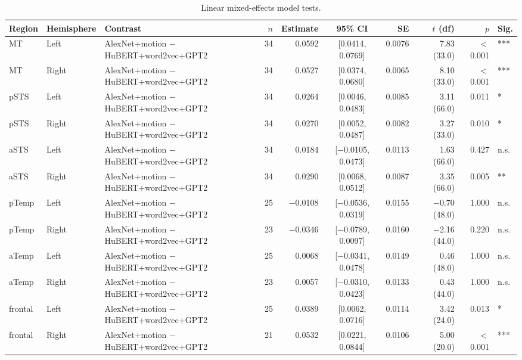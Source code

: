 \begin{table}[h]
\centering
\begin{tabular}{lllrrcrrrl}
\toprule
Region & Hemisphere & Contrast & $n$ & Estimate & 95\% CI & SE & $t$ (df) & $p$ & Sig. \\
\midrule
MT & Left & AlexNet+motion $-$ HuBERT+word2vec+GPT2 & 34 & 0.0592 & [0.0414, 0.0769] & 0.0076 & 7.83 (33.0) & $<$0.001 & *** \\
MT & Right & AlexNet+motion $-$ HuBERT+word2vec+GPT2 & 34 & 0.0527 & [0.0374, 0.0680] & 0.0065 & 8.10 (33.0) & $<$0.001 & *** \\
pSTS & Left & AlexNet+motion $-$ HuBERT+word2vec+GPT2 & 34 & 0.0264 & [0.0046, 0.0483] & 0.0085 & 3.11 (66.0) & 0.011 & * \\
pSTS & Right & AlexNet+motion $-$ HuBERT+word2vec+GPT2 & 34 & 0.0270 & [0.0052, 0.0487] & 0.0082 & 3.27 (33.0) & 0.010 & * \\
aSTS & Left & AlexNet+motion $-$ HuBERT+word2vec+GPT2 & 34 & 0.0184 & [$-$0.0105, 0.0473] & 0.0113 & 1.63 (66.0) & 0.427 & n.s. \\
aSTS & Right & AlexNet+motion $-$ HuBERT+word2vec+GPT2 & 34 & 0.0290 & [0.0068, 0.0512] & 0.0087 & 3.35 (66.0) & 0.005 & ** \\
pTemp & Left & AlexNet+motion $-$ HuBERT+word2vec+GPT2 & 25 & $-$0.0108 & [$-$0.0536, 0.0319] & 0.0155 & $-$0.70 (48.0) & 1.000 & n.s. \\
pTemp & Right & AlexNet+motion $-$ HuBERT+word2vec+GPT2 & 23 & $-$0.0346 & [$-$0.0789, 0.0097] & 0.0160 & $-$2.16 (44.0) & 0.220 & n.s. \\
aTemp & Left & AlexNet+motion $-$ HuBERT+word2vec+GPT2 & 25 & 0.0068 & [$-$0.0341, 0.0478] & 0.0149 & 0.46 (48.0) & 1.000 & n.s. \\
aTemp & Right & AlexNet+motion $-$ HuBERT+word2vec+GPT2 & 23 & 0.0057 & [$-$0.0310, 0.0423] & 0.0133 & 0.43 (44.0) & 1.000 & n.s. \\
frontal & Left & AlexNet+motion $-$ HuBERT+word2vec+GPT2 & 25 & 0.0389 & [0.0062, 0.0716] & 0.0114 & 3.42 (24.0) & 0.013 & * \\
frontal & Right & AlexNet+motion $-$ HuBERT+word2vec+GPT2 & 21 & 0.0532 & [0.0221, 0.0844] & 0.0106 & 5.00 (20.0) & $<$0.001 & *** \\
\bottomrule
\end{tabular}
\caption{Linear mixed-effects model tests.}
\end{table}
